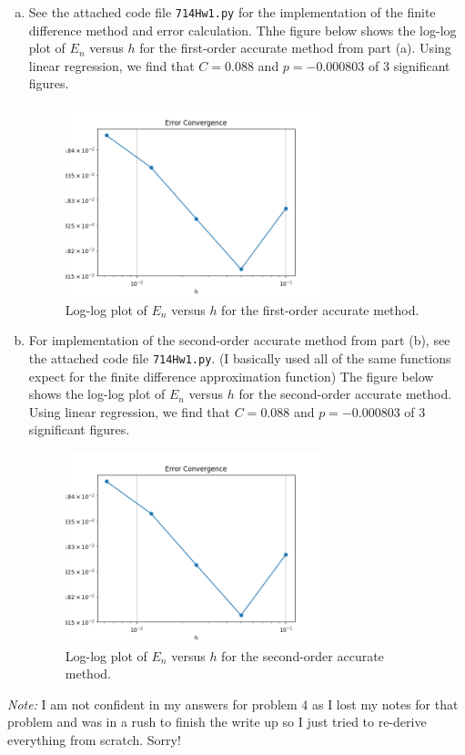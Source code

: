 \documentclass{article}
\begin{document}
\begin{enumerate}[(a)]
  \item See the attached code file \texttt{714Hw1.py} for the implementation of the finite difference method and error calculation. Thhe figure below shows the log-log plot of $E_n$ versus $h$ for the first-order accurate method from part (a). Using linear regression, we find that $C = 0.088$ and $p = -0.000803$ of 3 significant figures.
        \begin{figure}[H]
          \centering
          \includegraphics[width=0.7\textwidth]{Q4c.png}
          \caption{Log-log plot of $E_n$ versus $h$ for the first-order accurate method.}
        \end{figure}
  \item For implementation of the second-order accurate method from part (b), see the attached code file \texttt{714Hw1.py}. (I basically used all of the same functions expect for the finite difference approximation function) The figure below shows the log-log plot of $E_n$ versus $h$ for the second-order accurate method. Using linear regression, we find that  $C = 0.088$ and $p = -0.000803$ of 3 significant figures.
  \begin{figure}[H]
    \centering
    \includegraphics[width=0.7\textwidth]{Q4d.png}
    \caption{Log-log plot of $E_n$ versus $h$ for the second-order accurate method.}
  \end{figure}
        
\end{enumerate}


\textit{Note:} I am not confident in my answers for problem 4 as I lost my notes for that problem and was in a rush to finish the write up so I just tried to re-derive everything from scratch. Sorry!
\end{document}
